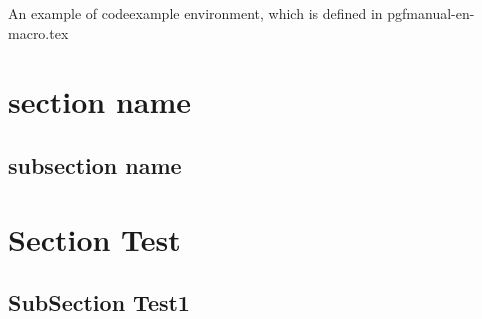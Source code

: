 \documentclass[10pt,a4paper,extrafontsizes]{memoir}
\begin{document}


An example of codeexample environment, which is defined in pgfmanual-en-macro.tex



\begin{codeexample}[]
%
\end{codeexample}

\section{section name} %
\label{sec:section_name}



\subsection{subsection name} %
\label{sub:subsection_name}


\section{Section Test}

\subsection{SubSection Test1}
\label{sub:subsec1}
\end{document}
